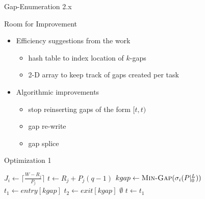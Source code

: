 \documentclass{beamer}
\begin{document}
\begin{section}{Gap-Enumeration 2.x}
\begin{frame}{Room for Improvement}
  \begin{itemize}
  \item{
    Efficiency suggestions from the work\autocite[17]{BelwalCheng}
    \begin{itemize}
    \item{hash table to index location of $k$-gaps}
    \item{2-D array to keep track of gaps created per task}
    \end{itemize}
  }
  \item{
    Algorithmic improvements
    \begin{itemize}
    \item{stop reinserting gaps of the form $[t,t)$}
    \item{gap re-write}
    \item{gap splice}
    \end{itemize}
  }
  \end{itemize}
\end{frame}
\begin{frame}{Optimization 1}
  \begin{algorithm}[H]
    \begin{multicols}{2}
    {\tiny
      \begin{algorithmic}[2]
          \State $J_{i} \gets \lceil\frac{W - R_{j}}{P_{j}}\rceil$
            \State $t \gets R_{j} + P_{j}(q-1)$
            \State $kgap \gets \Call{Min-Gap}{\sigma_{i}(P|_{0}^{L})}$
            \State $t_{1} \gets entry[kgap]$
            \State $t_{2} \gets exit[kgap]$
                \State \Return $\emptyset$
              \EndIf
                \State $t \gets t_{1}$
              \EndIf
                \State \Call{Gap-Delete}{$\sigma_{i}(P|_{0}^{L}), [t_{1},t_{2})$}
                    \State \Call{Gap-Insert}{$\sigma_{i}(P|_{0}^{L}), [t_{1},t)$}
                  \NewEndIf
                  \ExitWhile
                \EndIf
                      \State \Call{Gap-Insert}{$\sigma_{i}(P|_{0}^{L}), [t_{1},t)$}

\end{algorithmic}}
\end{multicols}
\end{algorithm}
\end{frame}
\end{section}
\end{document}
